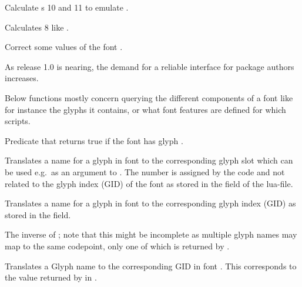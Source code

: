     Calculate s 10 and 11 to emulate \XETEX.
  \endaltitem

    Calculates  8 like \XETEX.
  \endaltitem

    Correct some values of the font .
  \endaltitem

\endfunctionlist

\endsubsection


As \LUATEX release 1.0 is nearing, the demand for a reliable interface
for package authors increases.

\endsubsubsection


Below functions mostly concern querying the different components of a
font like for instance the glyphs it contains, or what font features
are defined for which scripts.

\beginfunctionlist

            Predicate that returns true if the font 
            has glyph .
  \endaltitem

            Translates a name for a glyph in font  to the
            corresponding glyph slot which can be used e.g.\ as an argument to
            \inlinecode{\char}. The number is assigned by the  code
            and not related to the glyph index (GID) of the font as stored in the \identifier{[index]} field
            of the lua-file.
  \endaltitem

            Translates a name for a glyph in font  to the
            corresponding glyph index (GID) as stored in the \identifier{[index]} field.
  \endaltitem

            The inverse of ; note that this
            might be incomplete as multiple glyph names may map to the
            same codepoint, only one of which is returned by
            .
  \endaltitem

            Translates a Glyph name to the corresponding GID in font
            . This corresponds to the value returned by
            \inlinecode{\XeTeXglyphindex} in \XeTeX.
  \endaltitem

